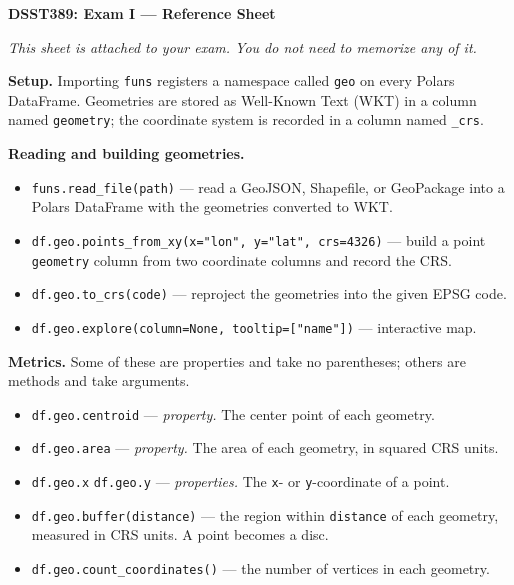 \documentclass[11pt, a4paper]{article}
\newcommand{\code}[1]{\texttt{#1}}
\begin{document}
\small

\begin{center}
\normalsize\textbf{DSST389: Exam I --- Reference Sheet}
\end{center}

\smallskip

\textit{This sheet is attached to your exam. You do not need to memorize any of it.}

\smallskip

\textbf{Setup.}
Importing \code{funs} registers a namespace called \code{geo} on every Polars DataFrame.
Geometries are stored as Well-Known Text (WKT) in a column named \code{geometry}; the
coordinate system is recorded in a column named \code{\_crs}.

\smallskip

\textbf{Reading and building geometries.}

\begin{itemize}
  \item \code{funs.read\_file(path)} --- read a GeoJSON, Shapefile, or GeoPackage into a
        Polars DataFrame with the geometries converted to WKT.
  \item \code{df.geo.points\_from\_xy(x="lon", y="lat", crs=4326)} --- build a point
        \code{geometry} column from two coordinate columns and record the CRS.
  \item \code{df.geo.to\_crs(code)} --- reproject the geometries into the given EPSG code.
  \item \code{df.geo.explore(column=None, tooltip=["name"])} --- interactive map.
\end{itemize}

\smallskip

\textbf{Metrics.}
Some of these are properties and take no parentheses; others are methods and take arguments.

\begin{itemize}
  \item \code{df.geo.centroid} --- \textit{property.} The center point of each geometry.
  \item \code{df.geo.area} --- \textit{property.} The area of each geometry, in squared
        CRS units.
  \item \code{df.geo.x} \quad \code{df.geo.y} --- \textit{properties.} The \code{x}- or
        \code{y}-coordinate of a point.
  \item \code{df.geo.buffer(distance)} --- the region within \code{distance} of each
        geometry, measured in CRS units. A point becomes a disc.
  \item \code{df.geo.count\_coordinates()} --- the number of vertices in each geometry.
\end{itemize}
\end{document}
